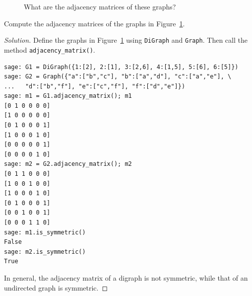 \begin{figure}[!htbp]
\centering
{}
\qquad
{}
\caption{What are the adjacency matrices of these graphs?}
\label{fig:introduction:adjacency_matrices}
\end{figure}

\begin{example}
Compute the adjacency matrices of the graphs in
Figure~\ref{fig:introduction:adjacency_matrices}.
\end{example}

\begin{proof}[Solution]
Define the graphs in Figure~\ref{fig:introduction:adjacency_matrices}
using \verb!DiGraph! and \verb!Graph!. Then call the method
\verb!adjacency_matrix()!.
\begin{lstlisting}
sage: G1 = DiGraph({1:[2], 2:[1], 3:[2,6], 4:[1,5], 5:[6], 6:[5]})
sage: G2 = Graph({"a":["b","c"], "b":["a","d"], "c":["a","e"], \
...   "d":["b","f"], "e":["c","f"], "f":["d","e"]})
sage: m1 = G1.adjacency_matrix(); m1
[0 1 0 0 0 0]
[1 0 0 0 0 0]
[0 1 0 0 0 1]
[1 0 0 0 1 0]
[0 0 0 0 0 1]
[0 0 0 0 1 0]
sage: m2 = G2.adjacency_matrix(); m2
[0 1 1 0 0 0]
[1 0 0 1 0 0]
[1 0 0 0 1 0]
[0 1 0 0 0 1]
[0 0 1 0 0 1]
[0 0 0 1 1 0]
sage: m1.is_symmetric()
False
sage: m2.is_symmetric()
True
\end{lstlisting}
In general, the adjacency matrix of a digraph is not symmetric, while
that of an undirected graph is symmetric.
\end{proof}

